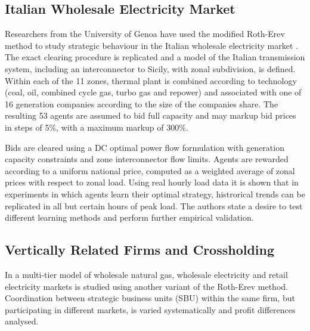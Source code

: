 \subsection{Italian Wholesale Electricity Market}
Researchers from the University of Genoa have used the modified Roth-Erev
method to study strategic behaviour in the Italian wholesale electricity market
\cite{cincotti:09}.  The exact clearing procedure is replicated and a model of
the Italian transmission system, including an interconnector to Sicily, with
zonal subdivision, is defined.  Within each of the 11 zones, thermal plant is
combined according to technology (coal, oil, combined cycle gas, turbo gas and
repower) and associated with one of 16 generation companies according to the
size of the companies share.  The resulting 53 agents are assumed to bid full
capacity and may markup bid prices in steps of 5\%, with a maximum markup of
300\%.


Bids are cleared using a DC optimal power flow formulation with
generation capacity constraints and zone interconnector flow limits.  Agents are
rewarded according to a uniform national price, computed as a weighted average
of zonal prices with respect to zonal load.  Using real hourly load data it
is shown that in experiments in which agents learn their optimal
strategy, histrorical trends can be replicated in all but certain hours of
peak load.  The authors state a desire to test different learning methods and perform
further empirical validation.

\subsection{Vertically Related Firms and Crossholding}
In \cite{micola:08} a multi-tier model of wholesale natural gas, wholesale
electricity and retail electricity markets is studied using another variant of
the Roth-Erev method.  Coordination between strategic business units (SBU)
within the same firm, but participating in different markets, is varied
systematically and profit differences analysed.

